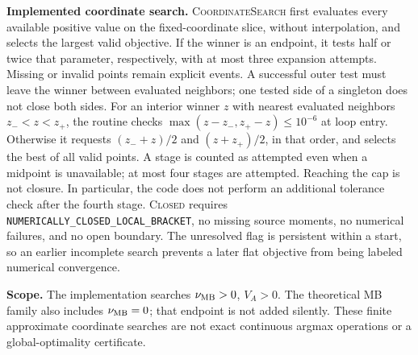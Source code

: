 \noindent\textbf{Implemented coordinate search.}
\textsc{CoordinateSearch} first evaluates every available positive value on the
fixed-coordinate slice, without interpolation, and selects the largest valid
objective. If the winner is an endpoint, it tests half or twice that parameter,
respectively, with at most three expansion attempts. Missing or invalid points
remain explicit events. A successful outer test must leave the winner between
evaluated neighbors; one tested side of a singleton does not close both sides.
For an interior winner $z$ with nearest evaluated neighbors $z_-<z<z_+$,
the routine checks
$\max(z-z_-,z_+-z)\le10^{-6}$ at loop entry. Otherwise it requests
$(z_-+z)/2$ and $(z+z_+)/2$, in that order, and selects the best of all valid
points. A stage is counted as attempted even when a midpoint is unavailable;
at most four stages are attempted. Reaching the cap is not closure. In
particular, the code does not perform an additional tolerance check after the
fourth stage. \textsc{Closed} requires
\texttt{NUMERICALLY\_CLOSED\_LOCAL\_BRACKET}, no missing source moments,
no numerical failures, and no open boundary. The unresolved flag is persistent
within a start, so an earlier incomplete search prevents a later flat objective
from being labeled numerical convergence.

\noindent\textbf{Scope.} The implementation searches $\nu_{\rm MB}>0$,
$V_A>0$. The theoretical MB family also includes $\nu_{\rm MB}=0$; that
endpoint is not added silently. These finite approximate coordinate searches
are not exact continuous argmax operations or a global-optimality certificate.
